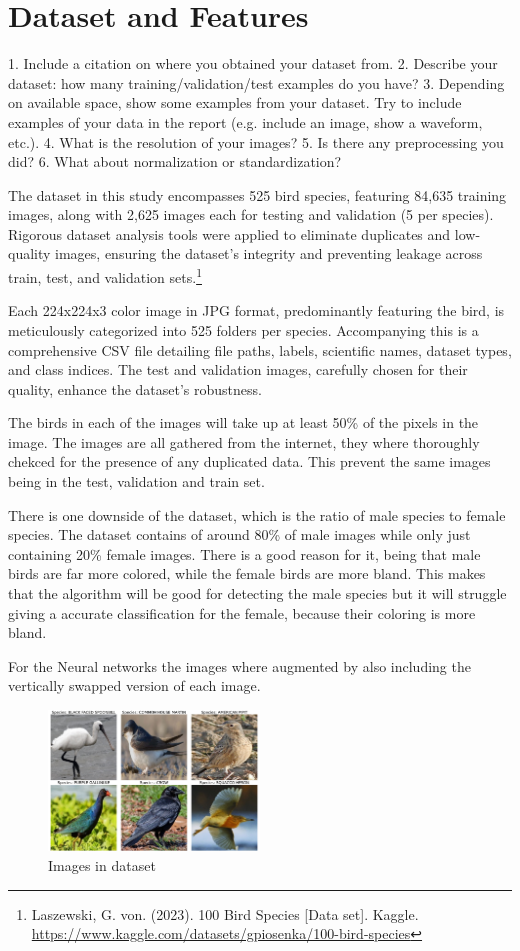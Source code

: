\section{Dataset and Features}
1. Include a citation on where you obtained your dataset from. 
2. Describe your dataset: how many training/validation/test examples do you have? 
3. Depending on available space, show some examples from your dataset. Try to include examples of your data in the report (e.g. include an image, show a waveform, etc.).
4. What is the resolution of your images? 
5. Is there any preprocessing you did? 
6. What about normalization or standardization? 

The dataset in this study encompasses 525 bird species, featuring 84,635 training images, along with 2,625 images each for testing and validation (5 per species). Rigorous dataset analysis tools were applied to eliminate duplicates and low-quality images, ensuring the dataset's integrity and preventing leakage across train, test, and validation sets.\footnote{Laszewski, G. von. (2023). 100 Bird Species [Data set]. Kaggle. \url{https://www.kaggle.com/datasets/gpiosenka/100-bird-species}}

Each 224x224x3 color image in JPG format, predominantly featuring the bird, is meticulously categorized into 525 folders per species. Accompanying this is a comprehensive CSV file detailing file paths, labels, scientific names, dataset types, and class indices. 
The test and validation images, carefully chosen for their quality, enhance the dataset's robustness. 

The birds in each of the images will take up at least 50\% of the pixels in the image. The images are all gathered from the internet, they where thoroughly chekced for the presence of any duplicated data. This prevent the same images being in the test, validation and train set. 

There is one downside of the dataset, which is the ratio of male species to female species. The dataset contains of around 80\% of male images while only just containing 20\% female images. There is a good reason for it, being that male birds are far more colored, while the female birds are more bland. This makes that the algorithm will be good for detecting the male species but it will struggle giving a accurate classification for the female, because their coloring is more bland. 

For the Neural networks the images where augmented by also including the vertically swapped version of each image. 

\begin{figure}[h]
    \centering
    \includegraphics[width=0.5\textwidth]{figs/dataset.png}
    \caption{Images in dataset}
    \label{fig:dataset}
\end{figure}